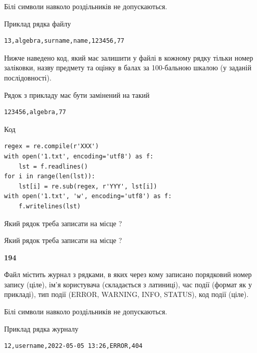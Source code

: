 Білі символи навколо роздільників не допускаються.

Приклад рядка файлу



\begin{verbatim}
13,algebra,surname,name,123456,77
\end{verbatim}


Нижче наведено код, який має залишити у файлі в кожному рядку тільки номер заліковки, назву предмету та оцінку в балах за 100-бальною шкалою (у заданій послі\-дов\-ності).

Рядок з прикладу має бути замінений на такий



\begin{verbatim}
123456,algebra,77
\end{verbatim}




Код



\begin{verbatim}
regex = re.compile(r'XXX')
with open('1.txt', encoding='utf8') as f:
    lst = f.readlines()
for i in range(len(lst)):
    lst[i] = re.sub(regex, r'YYY', lst[i])
with open('1.txt', 'w', encoding='utf8') as f:
    f.writelines(lst)
\end{verbatim}







Який рядок треба записати на місце  ?\par
\vspace{5mm}


Який рядок треба записати на місце  ?\par


\newpage

{\begin {center}\textbf{ 194}\end {center}}\par
Файл  містить журнал з рядками, в яких через кому записано поряд\-ко\-вий номер запису (ціле), ім'я користувача (складається з латиниці), час події (фор\-мат як у прикладі), тип події (ERROR, WARNING, INFO, STATUS), код події (ціле).

Білі символи навколо роздільників не допускаються.

Приклад рядка журналу



\begin{verbatim}
12,username,2022-05-05 13:26,ERROR,404
\end{verbatim}


